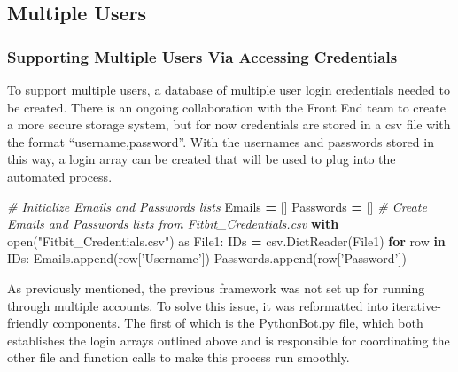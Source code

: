 \documentclass[]{book}
\newenvironment{Shaded}{\begin{snugshade}}{\end{snugshade}}
\newcommand{\KeywordTok}[1]{\textcolor[rgb]{0.13,0.29,0.53}{\textbf{#1}}}
\newcommand{\StringTok}[1]{\textcolor[rgb]{0.31,0.60,0.02}{#1}}
\newcommand{\ImportTok}[1]{#1}
\newcommand{\CommentTok}[1]{\textcolor[rgb]{0.56,0.35,0.01}{\textit{#1}}}
\newcommand{\ControlFlowTok}[1]{\textcolor[rgb]{0.13,0.29,0.53}{\textbf{#1}}}
\newcommand{\OperatorTok}[1]{\textcolor[rgb]{0.81,0.36,0.00}{\textbf{#1}}}
\newcommand{\BuiltInTok}[1]{#1}
\newcommand{\NormalTok}[1]{#1}
\begin{document}
\subsection{Multiple Users}\label{multiple-users}

\subsubsection{Supporting Multiple Users Via Accessing
Credentials}\label{supporting-multiple-users-via-accessing-credentials}

To support multiple users, a database of multiple user login credentials
needed to be created. There is an ongoing collaboration with the Front
End team to create a more secure storage system, but for now credentials
are stored in a csv file with the format ``username,password''. With the
usernames and passwords stored in this way, a login array can be created
that will be used to plug into the automated process.

\begin{Shaded}
\begin{Highlighting}[]
\CommentTok{# Initialize Emails and Passwords lists}
\NormalTok{Emails }\OperatorTok{=}\NormalTok{ []}
\NormalTok{Passwords }\OperatorTok{=}\NormalTok{ []}
\CommentTok{# Create Emails and Passwords lists from Fitbit_Credentials.csv}
\ControlFlowTok{with} \BuiltInTok{open}\NormalTok{(}\StringTok{"Fitbit_Credentials.csv"}\NormalTok{) }\ImportTok{as}\NormalTok{ File1:}
\NormalTok{    IDs }\OperatorTok{=}\NormalTok{ csv.DictReader(File1)}
    \ControlFlowTok{for}\NormalTok{ row }\KeywordTok{in}\NormalTok{ IDs:}
\NormalTok{        Emails.append(row[}\StringTok{'Username'}\NormalTok{])}
\NormalTok{        Passwords.append(row[}\StringTok{'Password'}\NormalTok{])}
\end{Highlighting}
\end{Shaded}

As previously mentioned, the previous framework was not set up for
running through multiple accounts. To solve this issue, it was
reformatted into iterative-friendly components. The first of which is
the PythonBot.py file, which both establishes the login arrays outlined
above and is responsible for coordinating the other file and function
calls to make this process run smoothly.
\end{document}
